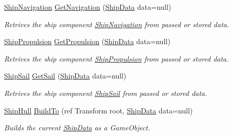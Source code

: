 \begin{DoxyCompactItemize}
\hyperlink{class_skyrates_1_1_client_1_1_ship_1_1_ship_navigation}{Ship\-Navigation} \hyperlink{class_skyrates_1_1_client_1_1_ship_1_1_ship_builder_a80045912b3ba7ac1a130883193338b88}{Get\-Navigation} (\hyperlink{class_ship_data}{Ship\-Data} data=null)
\begin{DoxyCompactList}\small\item\em Retrives the ship component \hyperlink{class_skyrates_1_1_client_1_1_ship_1_1_ship_navigation}{Ship\-Navigation} from passed or stored data. \end{DoxyCompactList}\item 
\hyperlink{class_skyrates_1_1_client_1_1_ship_1_1_ship_propulsion}{Ship\-Propulsion} \hyperlink{class_skyrates_1_1_client_1_1_ship_1_1_ship_builder_ac92e1e3ad5755dca444b6d18d93c9a42}{Get\-Propulsion} (\hyperlink{class_ship_data}{Ship\-Data} data=null)
\begin{DoxyCompactList}\small\item\em Retrives the ship component \hyperlink{class_skyrates_1_1_client_1_1_ship_1_1_ship_propulsion}{Ship\-Propulsion} from passed or stored data. \end{DoxyCompactList}\item 
\hyperlink{class_skyrates_1_1_client_1_1_ship_1_1_ship_sail}{Ship\-Sail} \hyperlink{class_skyrates_1_1_client_1_1_ship_1_1_ship_builder_a44d9c44d336bb602efe3fd68d5ed81c6}{Get\-Sail} (\hyperlink{class_ship_data}{Ship\-Data} data=null)
\begin{DoxyCompactList}\small\item\em Retrives the ship component \hyperlink{class_skyrates_1_1_client_1_1_ship_1_1_ship_sail}{Ship\-Sail} from passed or stored data. \end{DoxyCompactList}\item 
\hyperlink{class_skyrates_1_1_client_1_1_ship_1_1_ship_hull}{Ship\-Hull} \hyperlink{class_skyrates_1_1_client_1_1_ship_1_1_ship_builder_a0044eec6a8d989095a6842b6461d7753}{Build\-To} (ref Transform root, \hyperlink{class_ship_data}{Ship\-Data} data=null)
\begin{DoxyCompactList}\small\item\em Builds the current \hyperlink{class_ship_data}{Ship\-Data} as a Game\-Object. \end{DoxyCompactList}\end{DoxyCompactItemize}
